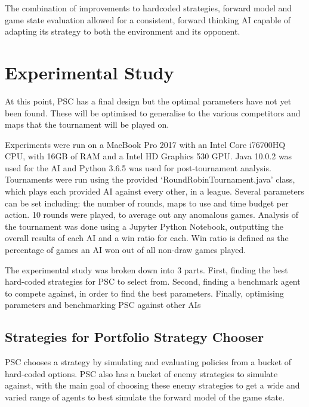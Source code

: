 \documentclass[]{article}
\begin{document}
The combination of improvements to hardcoded strategies, forward model and game state evaluation allowed for a consistent, forward thinking AI capable of adapting its strategy to both the environment and its opponent. 

\section{Experimental Study}

At this point, PSC has a final design but the optimal parameters have not yet been found. These will be optimised to generalise to the various competitors and maps that the tournament will be played on. 

Experiments were run on a MacBook Pro 2017 with an Intel Core i76700HQ CPU, with 16GB of RAM and a Intel HD Graphics 530 GPU. Java 10.0.2 was used for the AI and Python 3.6.5 was used for post-tournament analysis. Tournaments were run using the provided ‘RoundRobinTournament.java’ class, which plays each provided AI against every other, in a league. Several parameters can be set including: the number of rounds, maps to use and time budget per action. 10 rounds were played, to average out any anomalous games.
Analysis of the tournament was done using a Jupyter Python Notebook, outputting the overall results of each AI and a win ratio for each. Win ratio is defined as the percentage of games an AI won out of all non-draw games played. 


The experimental study was broken down into 3 parts.
First, finding the best hard-coded strategies for PSC to select from. Second, finding a benchmark agent to compete against, in order to find the best parameters. Finally, optimising parameters and benchmarking PSC against other AIs

\subsection{Strategies for Portfolio Strategy Chooser}

PSC chooses a strategy by simulating and evaluating policies from a bucket of hard-coded options. PSC also has a bucket of enemy strategies to simulate against, with the main goal of choosing these enemy strategies to get a wide and varied range of agents to best simulate the forward model of the game state.
\end{document}

